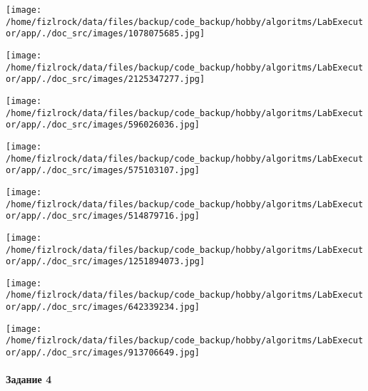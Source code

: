 \documentclass[a4paper, 12pt]{article}
\begin{document}
\texttt{[image: /home/fizlrock/data/files/backup/code\_backup/hobby/algoritms/LabExecutor/app/./doc\_src/images/1078075685.jpg]}

\texttt{[image: /home/fizlrock/data/files/backup/code\_backup/hobby/algoritms/LabExecutor/app/./doc\_src/images/2125347277.jpg]}

\texttt{[image: /home/fizlrock/data/files/backup/code\_backup/hobby/algoritms/LabExecutor/app/./doc\_src/images/596026036.jpg]}

\texttt{[image: /home/fizlrock/data/files/backup/code\_backup/hobby/algoritms/LabExecutor/app/./doc\_src/images/575103107.jpg]}

\texttt{[image: /home/fizlrock/data/files/backup/code\_backup/hobby/algoritms/LabExecutor/app/./doc\_src/images/514879716.jpg]}

\texttt{[image: /home/fizlrock/data/files/backup/code\_backup/hobby/algoritms/LabExecutor/app/./doc\_src/images/1251894073.jpg]}

\texttt{[image: /home/fizlrock/data/files/backup/code\_backup/hobby/algoritms/LabExecutor/app/./doc\_src/images/642339234.jpg]}

\texttt{[image: /home/fizlrock/data/files/backup/code\_backup/hobby/algoritms/LabExecutor/app/./doc\_src/images/913706649.jpg]}
\pagebreak
\paragraph{Задание 4}
\end{document}
